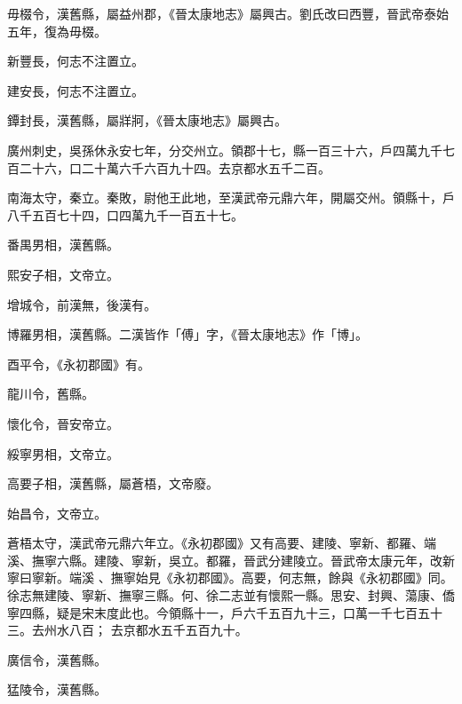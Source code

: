 \begin{pinyinscope}
 毋棳令，漢舊縣，屬益州郡，《晉太康地志》屬興古。劉氏改曰西豐，晉武帝泰始五年，復為毋棳。



 新豐長，何志不注置立。



 建安長，何志不注置立。



 鐔封長，漢舊縣，屬牂牁，《晉太康地志》屬興古。



 廣州刺史，吳孫休永安七年，分交州立。領郡十七，縣一百三十六，戶四萬九千七百二十六，口二十萬六千六百九十四。去京都水五千二百。



 南海太守，秦立。秦敗，尉他王此地，至漢武帝元鼎六年，開屬交州。領縣十，戶八千五百七十四，口四萬九千一百五十七。



 番禺男相，漢舊縣。



 熙安子相，文帝立。



 增城令，前漢無，後漢有。



 博羅男相，漢舊縣。二漢皆作「傅」字，《晉太康地志》作「博」。



 酉平令，《永初郡國》有。



 龍川令，舊縣。



 懷化令，晉安帝立。



 綏寧男相，文帝立。



 高要子相，漢舊縣，屬蒼梧，文帝廢。



 始昌令，文帝立。


蒼梧太守，漢武帝元鼎六年立。《永初郡國》又有高要、建陵、寧新、都羅、端溪、撫寧六縣。建陵、寧新，吳立。都羅，晉武分建陵立。晉武帝太康元年，改新寧曰寧新。端溪
 、撫寧始見《永初郡國》。高要，何志無，餘與《永初郡國》同。徐志無建陵、寧新、撫寧三縣。何、徐二志並有懷熙一縣。思安、封興、蕩康、僑寧四縣，疑是宋末度此也。今領縣十一，戶六千五百九十三，口萬一千七百五十三。去州水八百；
 去京都水五千五百九十。



 廣信令，漢舊縣。



 猛陵令，漢舊縣。




\end{pinyinscope}
